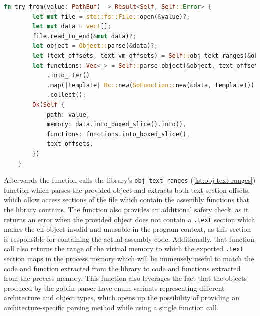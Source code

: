 \begin{lstlisting}[caption=\label{lst:so_from_pathbuf}{The method for creating object struct from file path}, language=Rust]
    fn try_from(value: PathBuf) -> Result<Self, Self::Error> {
        let mut file = std::fs::File::open(&value)?;
        let mut data = vec![];
        file.read_to_end(&mut data)?;
        let object = Object::parse(&data)?;
        let (text_offsets, text_vm_offsets) = Self::obj_text_ranges(&object)?;
        let functions: Vec<_> = Self::parse_object(&object, text_offsets.clone(), text_vm_offsets)?
            .into_iter()
            .map(|template| Rc::new(SoFunction::new(&data, template)))
            .collect();
        Ok(Self {
            path: value,
            memory: data.into_boxed_slice().into(),
            functions: functions.into_boxed_slice(),
            text_offsets,
        })
    }
\end{lstlisting}

Afterwards the function calls the library's \verb|obj_text_ranges| (\autoref{lst:obj-text-ranges}) function which parses the provided object and extracts both text section offsets, which allow access sections of the file which contain the assembly functions that the library contains.
The function also provides an additional safety check, as it returns an error when the provided object does not contain a \verb|.text| section which makes the elf object invalid and unusable in the program context, as this section is responsible for containing the actual assembly code.
Additionally, that function call also returns the range of the virtual memory to which the exported \verb|.text| section maps in the process memory which will be immensely useful to match the code and function extracted from the library to code and functions extracted from the process memory.
This function also leverages the fact that the objects produced by the goblin parser have enum variants representing different architecture and object types, which opens up the possibility of providing an architecture-specific parsing method while using a single function call.

